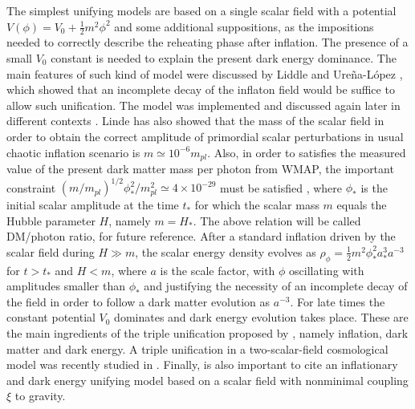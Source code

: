 \documentclass[preprintnumbers,amsmath,amssymb,nofootinbib]{revtex4}
\begin{document}

The simplest unifying models are based on a single scalar field with a potential $V(\phi)=V_0+\frac{1}{2}m^2\phi^2$ and some additional suppositions, as the impositions needed to correctly describe the reheating phase after inflation. The presence of a small $V_0$ constant is needed to explain the present dark energy dominance. The main features of such kind of model were discussed by Liddle and Ure\~na-L\'opez \cite{liddle2006,liddle2008}, which showed that an incomplete decay of the inflaton field would be suffice to allow such unification. The model was implemented and discussed again later in different contexts \cite{cardenas2007,pano2007,hidalgo2012,bastero2016}. Linde \cite{linde2002} has also showed that the mass of the scalar field in order to obtain the correct amplitude of primordial scalar perturbations in usual chaotic inflation scenario is $m\simeq 10^{-6}m_{pl}$. Also, in order to satisfies the measured value of the present dark matter mass per photon from WMAP, the important constraint $(m/m_{pl})^{1/2}\phi_*^2/m_{pl}^2 \simeq 4\times 10^{-29}$ must be satisfied \cite{liddle2006}, where $\phi_*$ is the initial scalar amplitude at the time $t_*$ for which the scalar mass $m$ equals the Hubble parameter $H$, namely $m=H_*$. The above relation will be called DM/photon ratio, for future reference. After a standard inflation driven by the scalar field during $H \gg m$, the scalar energy density evolves as $\rho_\phi=\frac{1}{2}m^2\phi_*^2a_*^3a^{-3}$ for $t>t_*$ and $H<m$, where $a$ is the scale factor, with $\phi$ oscillating with amplitudes smaller than $\phi_*$ and justifying the necessity of an incomplete decay of the field in order to follow a dark matter evolution as $a^{-3}$. For late times the constant potential $V_0$ dominates and dark energy evolution takes place. These are the main ingredients of the triple unification proposed by \cite{liddle2006,liddle2008}, namely inflation, dark matter and dark energy. A triple unification in a two-scalar-field cosmological model was recently studied in \cite{Paulo2020}. Finally, is also important to cite an inflationary and dark energy unifying model \cite{esha2015} based on a scalar field with nonminimal coupling $\xi$ to gravity.   
\end{document}
